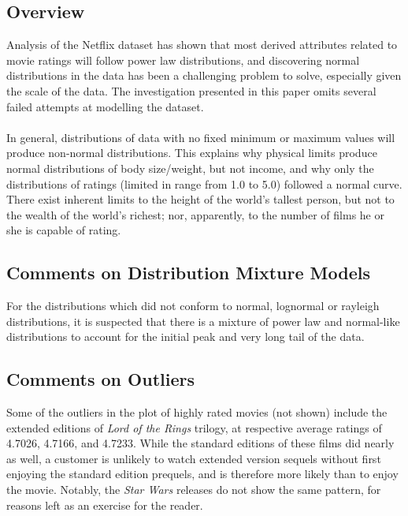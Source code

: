 \documentclass{acmtog}
\begin{document}
\subsection{Overview}
Analysis of the Netflix dataset has shown that most derived attributes related to movie ratings will follow power law distributions, and discovering normal distributions in the data has been a challenging problem to solve, especially given the scale of the data. The investigation presented in this paper omits several failed attempts at modelling the dataset. 
\\
\\
In general, distributions of data with no fixed minimum or maximum values will produce non-normal distributions. This explains why physical limits produce normal distributions of body size/weight, but not income, and why only the distributions of ratings (limited in range from 1.0 to 5.0) followed a normal curve. There exist inherent limits to the height of the world's tallest person, but not to the wealth of the world's richest; nor, apparently, to the number of films he or she is capable of rating.

\subsection{Comments on Distribution Mixture Models}
For the distributions which did not conform to normal, lognormal or rayleigh distributions, it is suspected that there is a mixture of power law and normal-like distributions to account for the initial peak and very long tail of the data.

\subsection{Comments on Outliers}
Some of the outliers in the plot of highly rated movies (not shown) include the extended editions of \textit{Lord of the Rings} trilogy, at respective average ratings of 4.7026, 4.7166, and 4.7233. While the standard editions of these films did nearly as well, a customer is unlikely to watch extended version sequels without first enjoying the standard edition prequels, and is therefore more likely than to enjoy the movie. Notably, the \textit{Star Wars} releases do not show the same pattern, for reasons left as an exercise for the reader.
\end{document}
